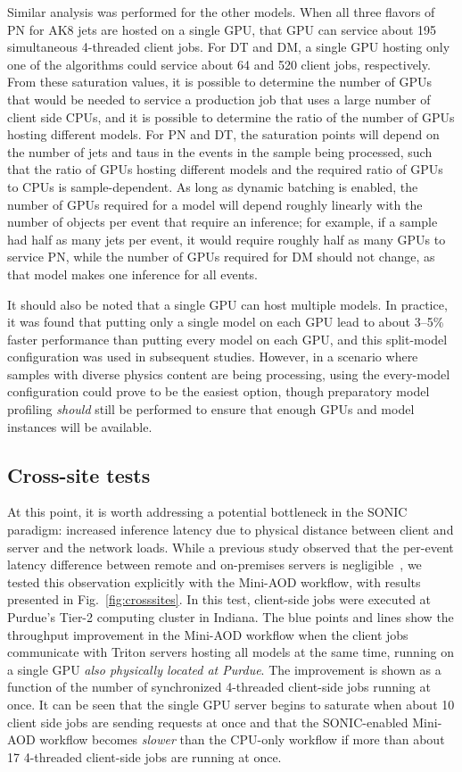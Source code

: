 Similar analysis was performed for the other models. When all three flavors of PN for AK8 jets are hosted on a single GPU, that GPU can service about 195 simultaneous 4-threaded client jobs. For DT and DM, a single GPU hosting only one of the algorithms could service about 64 and 520 client jobs, respectively. From these saturation values, it is possible to determine the number of GPUs that would be needed to service a production job that uses a large number of client side CPUs, and it is possible to determine the ratio of the number of GPUs hosting different models. For PN and DT, the saturation points will depend on the number of jets and taus in the events in the sample being processed, such that the ratio of GPUs hosting different models and the required ratio of GPUs to CPUs is sample-dependent. As long as dynamic batching is enabled, the number of GPUs required for a model will depend roughly linearly with the number of objects per event that require an inference; for example, if a sample had half as many jets per event, it would require roughly half as many GPUs to service PN, while the number of GPUs required for DM should not change, as that model makes one inference for all events.

It should also be noted that a single GPU can host multiple models. In practice, it was found that putting only a single model on each GPU lead to about 3--5\% faster performance than putting every model on each GPU, and this split-model configuration was used in subsequent studies. However, in a scenario where samples with diverse physics content are being processing, using the every-model configuration could prove to be the easiest option, though preparatory model profiling \textit{should} still be performed to ensure that enough GPUs and model instances will be available.

\subsection{Cross-site tests}
\label{sec:different_sites}

At this point, it is worth addressing a potential bottleneck in the SONIC paradigm: increased inference latency due to physical distance between client and server and the network loads. While a previous study observed that the per-event latency difference between remote and on-premises servers is negligible~\cite{Krupa:2020bwg}, we tested this observation explicitly with the Mini-AOD workflow, with results presented in Fig.~\ref{fig:crosssites}. In this test, client-side jobs were executed at Purdue's Tier-2 computing cluster in Indiana. The blue points and lines show the throughput improvement in the Mini-AOD workflow when the client jobs communicate with Triton servers hosting all models at the same time, running on a single GPU \textit{also physically located at Purdue}. The improvement is shown as a function of the number of synchronized 4-threaded client-side jobs running at once. It can be seen that the single GPU server begins to saturate when about 10 client side jobs are sending requests at once and that the SONIC-enabled Mini-AOD workflow becomes \textit{slower} than the CPU-only workflow if more than about 17 4-threaded client-side jobs are running at once.


